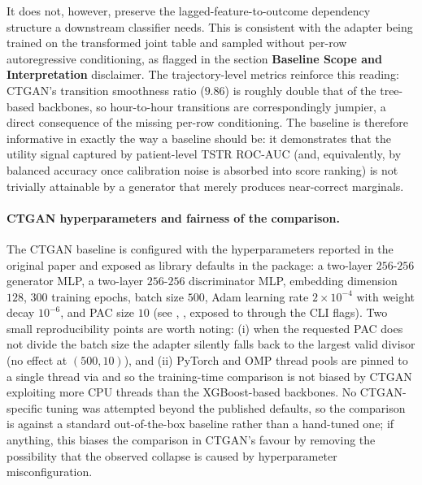 It does not, however, preserve the lagged-feature-to-outcome dependency structure a downstream classifier needs. This is consistent with the adapter being trained on the transformed joint table and sampled without per-row autoregressive conditioning, as flagged in the section \textbf{Baseline Scope and Interpretation} disclaimer. The trajectory-level metrics reinforce this reading: CTGAN's transition smoothness ratio ($9.86$) is roughly double that of the tree-based backbones, so hour-to-hour transitions are correspondingly jumpier, a direct consequence of the missing per-row conditioning. The baseline is therefore informative in exactly the way a baseline should be: it demonstrates that the utility signal captured by patient-level TSTR ROC-AUC (and, equivalently, by balanced accuracy once calibration noise is absorbed into score ranking) is not trivially attainable by a generator that merely produces near-correct marginals.

\paragraph{CTGAN hyperparameters and fairness of the comparison.}
The CTGAN baseline is configured with the hyperparameters reported in the original paper \cite{xu2019ctgan} and exposed as library defaults in the  package: a two-layer $256\text{-}256$ generator MLP, a two-layer $256\text{-}256$ discriminator MLP, embedding dimension $128$, $300$ training epochs, batch size $500$, Adam learning rate $2 \times 10^{-4}$ with weight decay $10^{-6}$, and PAC size $10$ (see , , exposed to  through the  CLI flags). Two small reproducibility points are worth noting: (i) when the requested PAC does not divide the batch size the adapter silently falls back to the largest valid divisor (no effect at $(500, 10)$), and (ii) PyTorch and OMP thread pools are pinned to a single thread via  and  so the training-time comparison is not biased by CTGAN exploiting more CPU threads than the XGBoost-based backbones. No CTGAN-specific tuning was attempted beyond the published defaults, so the comparison is against a standard out-of-the-box baseline rather than a hand-tuned one; if anything, this biases the comparison in CTGAN's favour by removing the possibility that the observed collapse is caused by hyperparameter misconfiguration.


